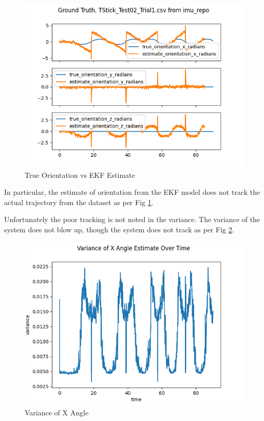 \documentclass[conference]{IEEEtran}
\begin{document}
\begin{figure}[h!]
  \includegraphics[width=\columnwidth]{true_values_vs_estimates.png}
  \caption{True Orientation vs EKF Estimate}
  \label{fig:orientation_estimate}
\end{figure}

In particular, the estimate of orientation from the EKF model does not track the actual trajectory from the dataset as per Fig \ref{fig:orientation_estimate}.

Unfortunately the poor tracking is not noted in the variance. The variance of the system does not blow up, though the system does not track as per Fig \ref{fig:variance}.
\begin{figure}[h!]
  \includegraphics[width=\columnwidth]{variance_over_time.png}
  \caption{Variance of X Angle}
  \label{fig:variance}
\end{figure}
\end{document}
